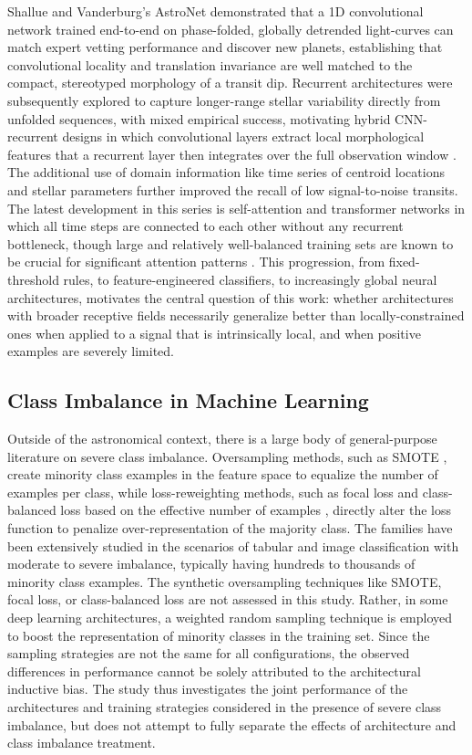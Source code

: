 \documentclass[preprint,11pt,times]{elsarticle}
\begin{document}
Shallue and Vanderburg's AstroNet \cite{bib6} demonstrated that a 1D convolutional network trained end-to-end on phase-folded, globally detrended light-curves can match expert vetting performance and discover new planets, establishing that convolutional locality and translation invariance are well matched to the compact, stereotyped morphology of a transit dip. Recurrent architectures were subsequently explored to capture longer-range stellar variability directly from unfolded sequences, with mixed empirical success, motivating hybrid CNN-recurrent designs in which convolutional layers extract local morphological features that a recurrent layer then integrates over the full observation window \cite{bib7}. The additional use of domain information like time series of centroid locations and stellar parameters \cite{bib15} further improved the recall of low signal-to-noise transits. The latest development in this series is self-attention and transformer networks in which all time steps are connected to each other without any recurrent bottleneck, though large and relatively well-balanced training sets are known to be crucial for significant attention patterns \cite{bib9}. This progression, from fixed-threshold rules, to feature-engineered classifiers, to increasingly global neural architectures, motivates the central question of this work: whether architectures with broader receptive fields necessarily generalize better than locally-constrained ones when applied to a signal that is intrinsically local, and when positive examples are severely limited.

\subsection{Class Imbalance in Machine Learning}\label{subsec2d}

Outside of the astronomical context, there is a large body of general-purpose literature on severe class imbalance. Oversampling methods, such as SMOTE \cite{bib4}, create minority class examples in the feature space to equalize the number of examples per class, while loss-reweighting methods, such as focal loss \cite{bib3} and class-balanced loss based on the effective number of examples \cite{bib10}, directly alter the loss function to penalize over-representation of the majority class. The families have been extensively studied in the scenarios of tabular and image classification with moderate to severe imbalance, typically having hundreds to thousands of minority class examples. The synthetic oversampling techniques like SMOTE, focal loss, or class-balanced loss are not assessed in this study. Rather, in some deep learning architectures, a weighted random sampling technique is employed to boost the representation of minority classes in the training set. Since the sampling strategies are not the same for all configurations, the observed differences in performance cannot be solely attributed to the architectural inductive bias. The study thus investigates the joint performance of the architectures and training strategies considered in the presence of severe class imbalance, but does not attempt to fully separate the effects of architecture and class imbalance treatment.
\end{document}
